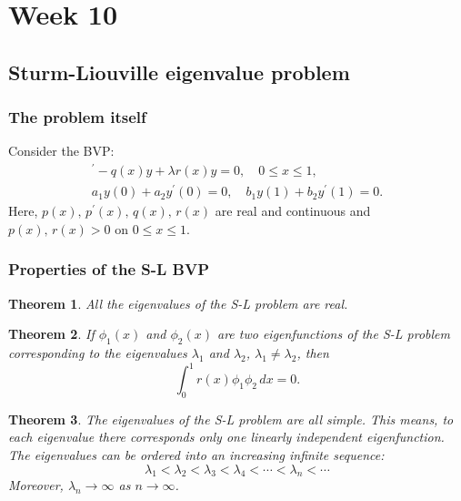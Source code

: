 \documentclass{article}
\newtheorem{theorem}{Theorem}
\begin{document}
\section{Week 10}
\subsection{Sturm-Liouville eigenvalue problem}
\subsubsection{The problem itself}
Consider the BVP:
\begin{align}
    [p(x)y^\prime]^\prime - q(x)y + \lambda r(x)y = 0,\quad 0\leq x\leq 1, \\
    a_1y(0)+a_2y^\prime(0) = 0,\quad b_1y(1)+b_2y^\prime(1) = 0.
\end{align}
Here, $p(x),\,p^\prime(x),\,q(x),\,r(x)$ are real and continuous and $p(x),\,r(x)>0$ on $0\leq x\leq 1$.

\subsubsection{Properties of the S-L BVP}
\begin{theorem}
    All the eigenvalues of the S-L problem are real.
\end{theorem}
\begin{theorem}
    If $\phi_1(x)$ and $\phi_2(x)$ are two eigenfunctions of the S-L problem corresponding to the eigenvalues $\lambda_1$ and $\lambda_2$, $\lambda_1\neq \lambda_2$, then
    \begin{equation}
        \int_0^1 r(x)\phi_1\phi_2\,dx=0.
    \end{equation}
\end{theorem}
\begin{theorem}
    The eigenvalues of the S-L problem are all simple. This means, to each eigenvalue there corresponds only one linearly independent eigenfunction. \\
    The eigenvalues can be ordered into an increasing infinite sequence:
    \begin{equation}
        \lambda_1<\lambda_2<\lambda_3<\lambda_4<\cdots<\lambda_n<\cdots 
    \end{equation}
    Moreover, $\lambda_n\to\infty$ as $n\to\infty$.
\end{theorem}
\end{document}
